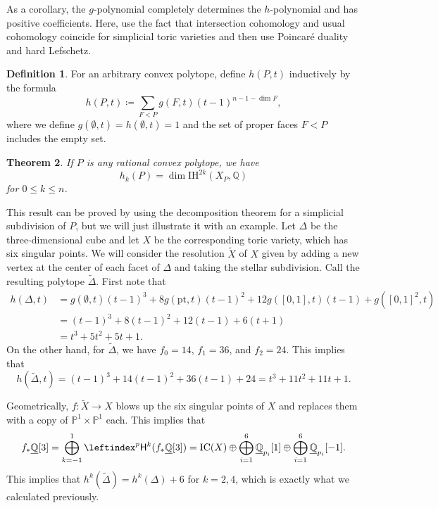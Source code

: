 \documentclass{amsart}
\newtheorem{thm}{Theorem}[section]
\theoremstyle{definition}
\newtheorem{defn}[thm]{Definition}
\theoremstyle{remark}
\theoremstyle{plain}
\theoremstyle{definition}
\theoremstyle{remark}
\newcommand{\Q}{\mathbb{Q}}
\renewcommand{\P}{\mathbb{P}}
\newcommand{\pH}{\leftindex^p{\mathsf{H}}}
\newcommand{\mr}[1]{\mathrm{#1}}
\newcommand{\on}[1]{\operatorname{#1}}
\newcommand{\ul}[1]{\underline{#1}}
\newcommand{\1}{\mathbf{1}}
\newcommand{\2}{\mathbf{2}}
\newcommand{\3}{\mathbf{3}}
\begin{document}
As a corollary, the $g$-polynomial completely determines the $h$-polynomial and has positive coefficients. Here, use the fact that intersection cohomology and usual cohomology coincide for simplicial toric varieties and then use Poincar\'e duality and hard Lefschetz.

\begin{defn}
    For an arbitrary convex polytope, define $h(P,t)$ inductively by the formula
    \[ h(P,t) \coloneqq \sum_{F < P} g(F,t)(t-1)^{n - 1 - \dim F}, \]
    where we define $g(\emptyset, t) = h(\emptyset,t) = 1$ and the set of proper faces $F < P$ includes the empty set.
\end{defn}

\begin{thm}
    If $P$ is any rational convex polytope, we have
    \[ h_k(P) = \dim \mr{IH}^{2k}(X_P, \Q) \]
    for $0 \leq k \leq n$.
\end{thm}
This result can be proved by using the decomposition theorem for a simplicial subdivision of $P$, but we will just illustrate it with an example.
Let $\Delta$ be the three-dimensional cube and let $X$ be the corresponding toric variety, which has six singular points. We will consider the resolution $\tilde{X}$ of $X$ given by adding a new vertex at the center of each facet of $\Delta$ and taking the stellar subdivision. Call the resulting polytope $\tilde{\Delta}$. First note that
\begin{align*}
    h(\Delta, t) &= g(\emptyset, t) (t-1)^3 + 8 g(\mr{pt}, t)(t-1)^2 + 12 g([0,1], t) (t-1) + g([0,1]^2, t) \\
    &= (t-1)^3 + 8(t-1)^2 + 12(t-1) + 6(t+1) \\
    &= t^3 + 5t^2 + 5t + 1.
\end{align*}
On the other hand, for $\tilde{\Delta}$, we have $f_0 = 14$, $f_1 = 36$, and $f_2 = 24$. This implies that
\[ h(\tilde{\Delta}, t) = (t-1)^3 + 14(t-1)^2 + 36(t-1) + 24 = t^3 + 11t^2 + 11t + 1. \]

Geometrically, $f \colon \tilde{X} \to X$ blows up the six singular points of $X$ and replaces them with a copy of $\P^1 \times \P^1$ each. This implies that
\[ f_* \ul{\Q}[3] = \bigoplus_{k=-1}^1 \pH^k(f_* \ul{\Q}[3]) = \on{IC}(X) \oplus \bigoplus_{i=1}^6 \ul{\Q}_{p_i}[1] \oplus \bigoplus_{i=1}^6 \ul{\Q}_{p_i}[-1]. \]
This implies that $h^{k}(\tilde{\Delta}) = h^k(\Delta) + 6$ for $k = 2,4$, which is exactly what we calculated previously.
\end{document}

